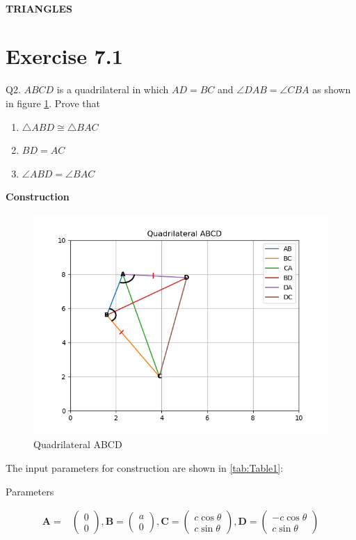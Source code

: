 \documentclass{article}
\newcommand{\myvec}[1]{\ensuremath{\begin{pmatrix}#1\end{pmatrix}}}
\let\vec\mathbf
\begin{document}
\begin{center}
        \textbf{ \\ TRIANGLES}
\end{center}
\section{Exercise 7.1}
Q2. $ABCD$ is a quadrilateral in which $AD = BC$ and $\angle{DAB} = \angle{CBA}$ as shown in figure \ref{fig:Fig}. Prove that
\begin{enumerate}
\item $\triangle{ABD} \cong \triangle{BAC}$
  \item $BD = AC$
  \item $\angle{ABD} = \angle{BAC}$
\end{enumerate}
\textbf{Construction}\\
\begin{figure}[h!]
	\begin{center}
		\includegraphics[width=\columnwidth]{figs/graph.png}
	\end{center}
	\caption{Quadrilateral ABCD}
	\label{fig:Fig}
\end{figure}
The input parameters for construction are shown in \ref{tab:Table1}:\\
\begin{table}[h!]
    \centering
    
    \caption{Parameters}
    \label{tab:Table1}
\end{table}
\pagebreak
\begin{align}
\vec{A} =& \myvec{0\\0},\vec{B} = \myvec{a\\0},\vec{C} = \myvec{c\cos\theta\\c\sin\theta},\vec{D} = \myvec{-c\cos\theta\\c\sin\theta}
\end{align}
\end{document}
